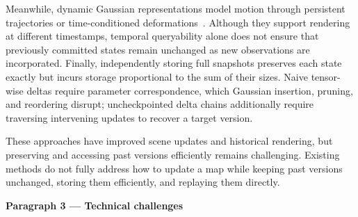 Meanwhile, dynamic Gaussian representations model motion through
persistent trajectories or time-conditioned
deformations~\cite{luiten2024dynamic,wu2024gaussians}.
Although they support rendering at different timestamps, temporal
queryability alone does not ensure that previously committed states
remain unchanged as new observations are incorporated.
Finally, independently storing full snapshots preserves each state
exactly but incurs storage proportional to the sum of their sizes.
Naive tensor-wise deltas require parameter correspondence, which
Gaussian insertion, pruning, and reordering disrupt; uncheckpointed
delta chains additionally require traversing intervening updates to
recover a target version.

These approaches have improved scene updates and historical rendering, but preserving and accessing past versions efficiently remains challenging. 
Existing methods do not fully address how to update a map while keeping past versions unchanged, storing them efficiently, and replaying them directly.


\textbf{Paragraph 3 — Technical challenges}






